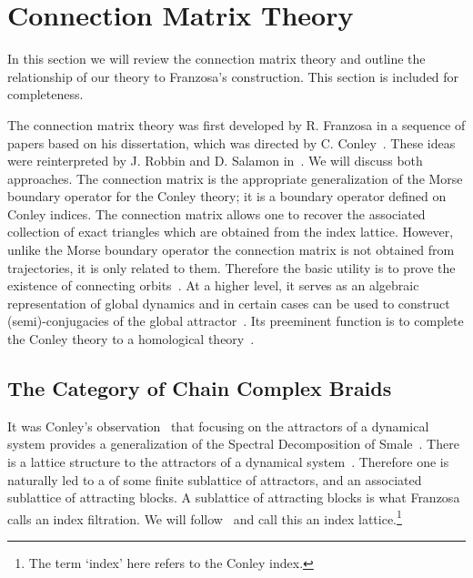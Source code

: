 
\section{Connection Matrix Theory}\label{sec:CMT}

In this section we will review the connection matrix theory and outline the relationship of our theory to Franzosa's construction.  This section is included for completeness.

The connection matrix theory was first developed by R. Franzosa in a sequence of papers based on his dissertation, which was directed by C. Conley~\cite{fran2,fran,fran3}.  These ideas were reinterpreted by J. Robbin and D. Salamon in~\cite{robbin:salamon}.  We will discuss both approaches.  The connection matrix is the appropriate generalization of the Morse boundary operator for the Conley theory; it is a boundary operator defined on Conley indices.   The connection matrix allows one to recover the associated collection of exact triangles which are obtained from the index lattice.  However, unlike the Morse boundary operator the connection matrix is not obtained from trajectories, it is only related to them.  Therefore the basic utility is to prove the existence of connecting orbits~\cite{mpmw}.  At a higher level, it serves as an algebraic representation of global dynamics and in certain cases can be used to construct (semi)-conjugacies of the global attractor~\cite{dhmo,mcmodels,scalar}. Its preeminent function is to complete the Conley theory to a homological theory~\cite{mc}.  


\subsection{The Category of Chain Complex Braids}
It was Conley's observation~\cite{conley} that focusing on the attractors of a dynamical system provides a generalization of the Spectral Decomposition of Smale~\cite[Theorem 6.2]{smale}.  There is a lattice structure to the attractors of a dynamical system~\cite{robbin:salamon,lsa,lsa2}.  Therefore one is naturally led to a of some finite sublattice of attractors, and an associated sublattice of attracting blocks.  A sublattice of attracting blocks is what Franzosa calls an index filtration.  We will follow~\cite{lsa} and call this an index lattice.\footnote{The term `index' here refers to the Conley index.}

